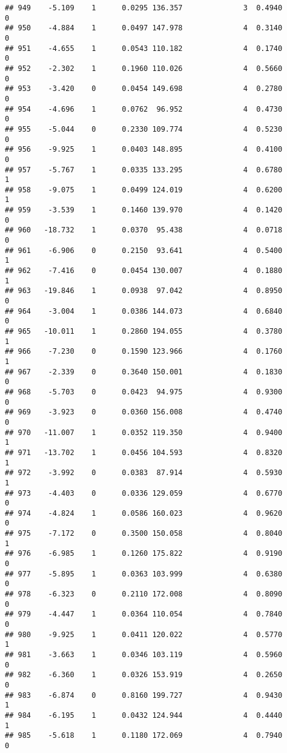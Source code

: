 \documentclass[
]{article}
\begin{document}
\begin{verbatim}
## 949    -5.109    1      0.0295 136.357              3  0.4940      0
## 950    -4.884    1      0.0497 147.978              4  0.3140      0
## 951    -4.655    1      0.0543 110.182              4  0.1740      0
## 952    -2.302    1      0.1960 110.026              4  0.5660      0
## 953    -3.420    0      0.0454 149.698              4  0.2780      0
## 954    -4.696    1      0.0762  96.952              4  0.4730      0
## 955    -5.044    0      0.2330 109.774              4  0.5230      0
## 956    -9.925    1      0.0403 148.895              4  0.4100      0
## 957    -5.767    1      0.0335 133.295              4  0.6780      1
## 958    -9.075    1      0.0499 124.019              4  0.6200      1
## 959    -3.539    1      0.1460 139.970              4  0.1420      0
## 960   -18.732    1      0.0370  95.438              4  0.0718      0
## 961    -6.906    0      0.2150  93.641              4  0.5400      1
## 962    -7.416    0      0.0454 130.007              4  0.1880      1
## 963   -19.846    1      0.0938  97.042              4  0.8950      0
## 964    -3.004    1      0.0386 144.073              4  0.6840      0
## 965   -10.011    1      0.2860 194.055              4  0.3780      1
## 966    -7.230    0      0.1590 123.966              4  0.1760      1
## 967    -2.339    0      0.3640 150.001              4  0.1830      0
## 968    -5.703    0      0.0423  94.975              4  0.9300      0
## 969    -3.923    0      0.0360 156.008              4  0.4740      0
## 970   -11.007    1      0.0352 119.350              4  0.9400      1
## 971   -13.702    1      0.0456 104.593              4  0.8320      1
## 972    -3.992    0      0.0383  87.914              4  0.5930      1
## 973    -4.403    0      0.0336 129.059              4  0.6770      0
## 974    -4.824    1      0.0586 160.023              4  0.9620      0
## 975    -7.172    0      0.3500 150.058              4  0.8040      1
## 976    -6.985    1      0.1260 175.822              4  0.9190      0
## 977    -5.895    1      0.0363 103.999              4  0.6380      0
## 978    -6.323    0      0.2110 172.008              4  0.8090      0
## 979    -4.447    1      0.0364 110.054              4  0.7840      0
## 980    -9.925    1      0.0411 120.022              4  0.5770      1
## 981    -3.663    1      0.0346 103.119              4  0.5960      0
## 982    -6.360    1      0.0326 153.919              4  0.2650      0
## 983    -6.874    0      0.8160 199.727              4  0.9430      1
## 984    -6.195    1      0.0432 124.944              4  0.4440      1
## 985    -5.618    1      0.1180 172.069              4  0.7940      0

\end{verbatim}
\end{document}
